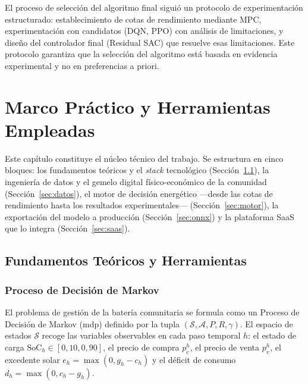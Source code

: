\documentclass[12pt, a4paper, twoside]{report}
\begin{document}
El proceso de selección del algoritmo final siguió un protocolo de
experimentación estructurado: establecimiento de cotas de rendimiento mediante
MPC, experimentación con candidatos (DQN, PPO) con análisis de limitaciones, y
diseño del controlador final (Residual SAC) que resuelve esas limitaciones. Este
protocolo garantiza que la selección del algoritmo está basada en evidencia
experimental y no en preferencias a priori.

\chapter{Marco Práctico y Herramientas Empleadas}
\label{chap:marco}

Este capítulo constituye el núcleo técnico del trabajo. Se estructura en cinco
bloques: los fundamentos teóricos y el \textit{stack} tecnológico
(Sección~\ref{sec:fundamentos}), la ingeniería de datos y el gemelo digital
físico-económico de la comunidad (Sección~\ref{sec:datos}), el motor de
decisión energético —desde las cotas de rendimiento hasta los resultados
experimentales— (Sección~\ref{sec:motor}), la exportación del modelo a
producción (Sección~\ref{sec:onnx}) y la plataforma SaaS que lo integra
(Sección~\ref{sec:saas}).

\section{Fundamentos Teóricos y Herramientas}
\label{sec:fundamentos}

\subsection{Proceso de Decisión de Markov}

El problema de gestión de la batería comunitaria se formula como un
Proceso de Decisión de Markov (\acrshort{mdp}) definido por la tupla $(\mathcal{S}, \mathcal{A}, P, R, \gamma)$.
El espacio de estados $\mathcal{S}$ recoge las variables observables en cada
paso temporal $h$: el estado de carga $\text{SoC}_h \in [0{,}10, 0{,}90]$, el
precio de compra $p_c^h$, el precio de venta $p_v^h$, el excedente solar
$e_h = \max(0, g_h - c_h)$ y el déficit de consumo $d_h = \max(0, c_h - g_h)$.
\end{document}
